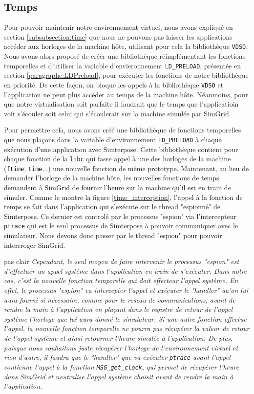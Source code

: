 \subsection{Temps}
\label{section:work:time}

Pour pouvoir maintenir notre environnement virtuel, nous avons expliqué en section \ref{subsubsection:time} que nous ne pouvons pas laisser les applications accéder aux horloges de la machine hôte, utilisant pour cela la bibliothèque \texttt{VDSO}. Nous avons alors proposé de créer une bibliothèque réimplémentant les fonctions temporelles et d'utiliser la variable d'envieronnement \texttt{LD\_PRELOAD}, présentée en section \ref{paragraphe:LDPreload}, pour exécuter les fonctions de notre bibliothèque en priorité. De cette façon, on bloque les appels à la bibliothèque \texttt{VDSO} et l'application ne peut plus accéder au temps de la machine hôte. Néanmoins, pour que notre virtualisation soit parfaite il faudrait que le temps que l'applicatioin voit s'écouler soit celui qui s'écoulerait sur la machine simulée par SimGrid. 

Pour permettre cela, nous avons créé une bibliothèque de fonctions temporelles que nous plaçons dans la variable d'environnement \texttt{LD\_PRELOAD} à chaque exécution d'une application avec Simterpose. Cette bibliothèque contient pour chaque fonction de la \texttt{libc} qui fasse appel à une des horloges de la machine (\texttt{ftime}, \texttt{time}...) une nouvelle fonction de même prototype. Maintenant, au lieu de demander l'horloge de la machine hôte, les nouvelles fonctions de temps demandent à SimGrid de fournir l'heure sur la machine qu'il est en train de simuler. Comme le montre la figure \ref{time_interception}, l'appel à la fonction de temps se fait dans l'application qui s'exécute sur le thread "espionné" de Simterpose. Ce dernier est controlé par le processus 'espion' via l'intercepteur \texttt{ptrace} qui est le seul processus de Simterpose à pouvoir communiquer avec le simulateur. Nous devons donc passer par le thread "espion" pour pouvoir interrroger SimGrid. 

{\color{red} pas clair}
\textit{Cependant, le seul moyen de faire intervenir le processus "espion" est d'effectuer un appel système dans l'application en train de s'exécuter. Dans notre cas, c'est la nouvelle fonction temporelle qui doit effecteur l'appel système. En effet, le processus "espion" va intercepter l'appel et exécuter le "handler" qu'on lui aura fourni si nécessaire, comme pour le reseau de communications, avant de rendre la main à l'application en plaçant dans le registre de retour de l'appel système l'horloge que lui aura donné le simulateur. Si une autre fonction effectue l'appel, la nouvelle fonction temporelle ne pourra pas récupérer la valeur de retour de l'appel système et ainsi retourner l'heure simulée à l'application. De plus, puisque nous souhaitons juste récupérer l'horloge de l'environnement virtuel et rien d'autre, il faudra que le "handler" que va exécuter \texttt{ptrace} avant l'appel contienne l'appel à la fonction \texttt{MSG\_get\_clock}, qui permet de récupérer l'heure dans SimGrid et neutralise l'appel système choisit avant de rendre la main à l'application. 
}

